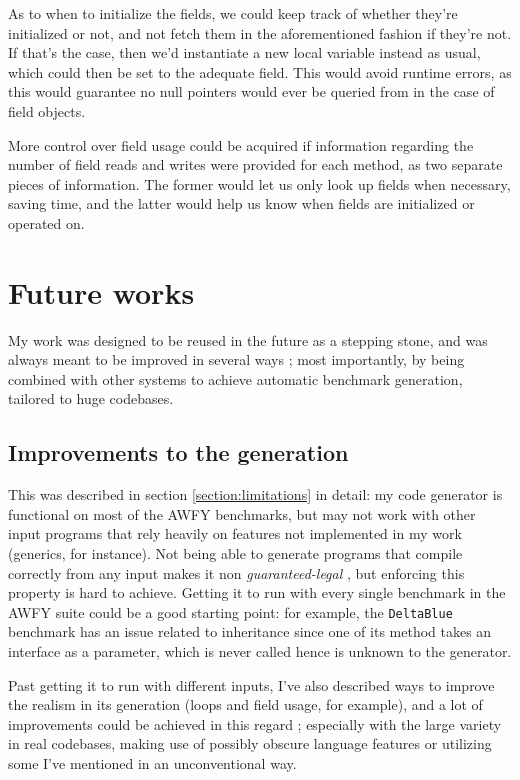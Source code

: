 \documentclass[12pt]{article}
\begin{document}
As to when to initialize the fields, we could keep track of whether they're initialized or not, and not fetch them in the aforementioned fashion if they're not. If that's the case, then we'd instantiate a new local variable instead as usual, which could then be set to the adequate field. This would avoid runtime errors, as this would guarantee no null pointers would ever be queried from in the case of field objects.

More control over field usage could be acquired if information regarding the number of field reads and writes were provided for each method, as two separate pieces of information. The former would let us only look up fields when necessary, saving time, and the latter would help us know when fields are initialized or operated on. 


\newpage
\section{Future works}
My work was designed to be reused in the future as a stepping stone, and was always meant to be improved in several ways ; most importantly, by being combined with other systems to achieve automatic benchmark generation, tailored to huge codebases.

\subsection{Improvements to the generation} 
This was described in section \ref{section:limitations} in detail: my code generator is functional on most of the AWFY benchmarks, but may not work with other input programs that rely heavily on features not implemented in my work (generics, for instance). Not being able to generate programs that compile correctly from any input makes it non \textit{guaranteed-legal} \cite{program-generators}, but enforcing this property is hard to achieve. Getting it to run with every single benchmark in the AWFY suite could be a good starting point: for example, the \texttt{DeltaBlue} benchmark has an issue related to inheritance since one of its method takes an interface as a parameter, which is never called hence is unknown to the generator.

Past getting it to run with different inputs, I've also described ways to improve the realism in its generation (loops and field usage, for example), and a lot of improvements could be achieved in this regard ; especially with the large variety in real codebases, making use of possibly obscure language features or utilizing some I've mentioned in an unconventional way.
\end{document}
